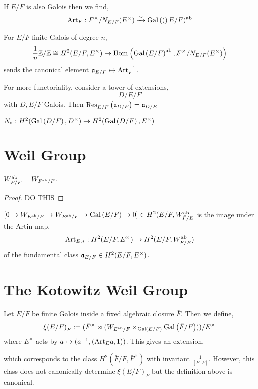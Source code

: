 \documentclass[12pt]{article}
\begin{document}
If $E / F$ is also Galois then we find,
\[ \mathrm{Art}_F : F^\times / N_{E/F}(E^\times) \xrightarrow{\sim} \mathrm{Gal}\left( ( \right)E/F)^{\mathrm{ab}} \]

\begin{lemma}[Nakayama]
For $E / F$ finite Galois of degree $n$,
\[ \frac{1}{n} \mathbb{Z} / \mathbb{Z} \cong H^2(E/F, E^\times) \to \mathrm{Hom}_{} \left( \mathrm{Gal}\left( E/F \right)^{\mathrm{ab}}, F^\times / N_{E/F}(E^\times) \right) \]
sends the canonical element $\mathfrak{a}_{E/F} \mapsto \mathrm{Art}_F^{-1}$. 
\end{lemma}

For more functoriality, consider a tower of extensions,
\[ D / E / F \]
with $D, E / F$ Galois. Then $\mathrm{Res}^{}_{E/F} \left( \mathfrak{a}_{D/F} \right) = \mathfrak{a}_{D/E}$ 

\begin{lemma}

\end{lemma}

\begin{cor}
$N_* : H^2(\mathrm{Gal}\left( D/F \right), D^\times) \to H^2(\mathrm{Gal}\left( D/F \right), E^\times)$ 
\end{cor}

\section{Weil Group}

\begin{prop}
$W^{\mathrm{ab}}_{\bar{F} / F} = W_{F^{\mathrm{ab}} / F}$. 
\end{prop}

\begin{proof}
DO THIS
\end{proof}

\begin{cor}
$[ 0 \to W_{E^{\mathrm{ab}} / E} \to W_{E^{\mathrm{ab}} / F} \to \mathrm{Gal}\left( E/F \right) \to 0] \in H^2(E/ F, W^{\mathrm{ab}}_{\bar{F} / E}$ is the image under the Artin map,
\[ \mathrm{Art}_{E, *} : H^2(E/F, E^\times) \to H^2(E/F, W^{\mathrm{ab}}_{\bar{F}/E}) \]
of the fundamental class $\mathfrak{a}_{E/F} \in H^2(E/F, E^\times)$.
\end{cor}

\section{The Kotowitz Weil Group}

Let $E/F$ be finite Galois inside a fixed algebraic closure $\bar{F}$. Then we define, 
\[ \xi(E/F)_{\bar{F}} := (\bar{F}^\times \rtimes (W_{E^{\mathrm{ab}}/ F} \times_{\mathrm{Gal}\left( E/F \right)} \mathrm{Gal}\left( \bar{F}/F \right))) / E^\times \]
where $E^\times$ acts by $a \mapsto (a^{-1}, (\mathrm{Art}_E a, 1))$. This gives an extension,
\begin{center}
\end{center}
which corresponds to the class $H^2(\bar{F} / F, \bar{F}^\times)$ with invariant $\frac{1}{[E : F]}$. However, this class does not canonically determine $\xi(E/F)_{\bar{F}}$ but the definition above is canonical. 
\end{document}
